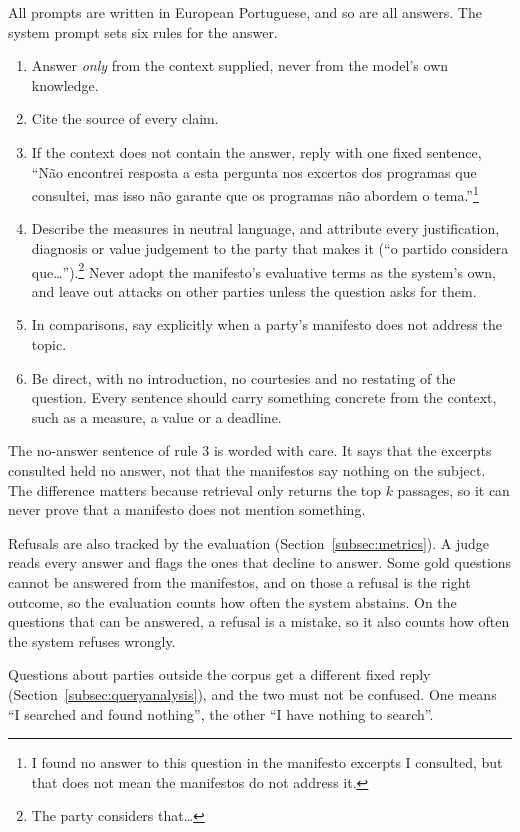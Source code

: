 All prompts are written in European Portuguese, and so are all answers. The
system prompt sets six rules for the answer.
\begin{enumerate}
    \item Answer \emph{only} from the context supplied, never from the model's
    own knowledge.
    \item Cite the source of every claim.
    \item If the context does not contain the answer, reply with one fixed
    sentence, ``Não encontrei resposta a esta pergunta nos excertos dos
    programas que consultei, mas isso não garante que os programas não abordem
    o tema.''\footnote{I found no answer to this question in the manifesto
    excerpts I consulted, but that does not mean the manifestos do not address
    it.}
    \item Describe the measures in neutral language, and attribute every
    justification, diagnosis or value judgement to the party that makes it
    (``o partido considera que\ldots'').\footnote{The party considers
    that\ldots} Never adopt the manifesto's evaluative terms as the system's
    own, and leave out attacks on other parties unless the question asks for
    them.
    \item In comparisons, say explicitly when a party's manifesto does not
    address the topic.
    \item Be direct, with no introduction, no courtesies and no restating of
    the question. Every sentence should carry something concrete from the
    context, such as a measure, a value or a deadline.
\end{enumerate}

The no-answer sentence of rule 3 is worded with care. It says that the
excerpts consulted held no answer, not that the manifestos say nothing on the
subject. The difference matters because retrieval only returns the top $k$
passages, so it can never prove that a manifesto does not mention something.

Refusals are also tracked by the evaluation (Section~\ref{subsec:metrics}). A
judge reads every answer and flags the ones that decline to answer. Some gold
questions cannot be answered from the manifestos, and on those a refusal is the
right outcome, so the evaluation counts how often the system abstains. On the
questions that can be answered, a refusal is a mistake, so it also counts how
often the system refuses wrongly.

Questions about parties outside the corpus get
a different fixed reply (Section~\ref{subsec:queryanalysis}), and the two must
not be confused. One means ``I searched and found nothing'', the other ``I
have nothing to search''.

